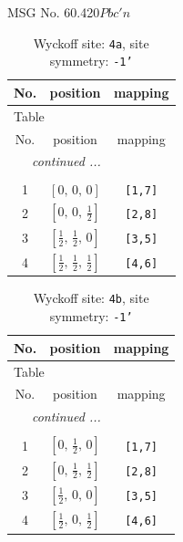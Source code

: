 \documentclass[fleqn,8pt]{jsarticle}
\begin{document}
\setcounter{MaxMatrixCols}{32}

\renewcommand{\tablename}{Table~}
\renewcommand{\figurename}{Figure~}
\begin{center}
\LARGE
MSG No. 60.420\quad$Pbc'n$
\end{center}
\renewcommand{\arraystretch}{1.2}
\begin{longtable}{ccc}
\caption{Wyckoff site: {\tt 4a}, site symmetry: {\tt -1'}}
 \\
 \hline \hline
No. & position & mapping \\ \hline \endfirsthead

\multicolumn{2}{l}{\tablename\ \thetable{}} \\
 \hline \hline
No. & position & mapping \\ \hline \endhead

 \hline \hline
\multicolumn{2}{r}{\footnotesize\it continued ...} \\ \endfoot

 \hline \hline
\multicolumn{2}{r}{} \\ \endlastfoot

1 & $\left[ 0,\, 0,\, 0 \right]$ & {\tt [1,7]} \\ \hline
2 & $\left[ 0,\, 0,\, \frac{1}{2} \right]$ & {\tt [2,8]} \\ \hline
3 & $\left[ \frac{1}{2},\, \frac{1}{2},\, 0 \right]$ & {\tt [3,5]} \\ \hline
4 & $\left[ \frac{1}{2},\, \frac{1}{2},\, \frac{1}{2} \right]$ & {\tt [4,6]} \\
\end{longtable}
\renewcommand{\arraystretch}{1.2}
\begin{longtable}{ccc}
\caption{Wyckoff site: {\tt 4b}, site symmetry: {\tt -1'}}
 \\
 \hline \hline
No. & position & mapping \\ \hline \endfirsthead

\multicolumn{2}{l}{\tablename\ \thetable{}} \\
 \hline \hline
No. & position & mapping \\ \hline \endhead

 \hline \hline
\multicolumn{2}{r}{\footnotesize\it continued ...} \\ \endfoot

 \hline \hline
\multicolumn{2}{r}{} \\ \endlastfoot

1 & $\left[ 0,\, \frac{1}{2},\, 0 \right]$ & {\tt [1,7]} \\ \hline
2 & $\left[ 0,\, \frac{1}{2},\, \frac{1}{2} \right]$ & {\tt [2,8]} \\ \hline
3 & $\left[ \frac{1}{2},\, 0,\, 0 \right]$ & {\tt [3,5]} \\ \hline
4 & $\left[ \frac{1}{2},\, 0,\, \frac{1}{2} \right]$ & {\tt [4,6]} \\
\end{longtable}
\end{document}
